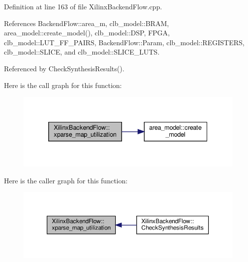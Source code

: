 Definition at line 163 of file Xilinx\+Backend\+Flow.\+cpp.



References Backend\+Flow\+::area\+\_\+m, clb\+\_\+model\+::\+B\+R\+AM, area\+\_\+model\+::create\+\_\+model(), clb\+\_\+model\+::\+D\+SP, F\+P\+GA, clb\+\_\+model\+::\+L\+U\+T\+\_\+\+F\+F\+\_\+\+P\+A\+I\+RS, Backend\+Flow\+::\+Param, clb\+\_\+model\+::\+R\+E\+G\+I\+S\+T\+E\+RS, clb\+\_\+model\+::\+S\+L\+I\+CE, and clb\+\_\+model\+::\+S\+L\+I\+C\+E\+\_\+\+L\+U\+TS.



Referenced by Check\+Synthesis\+Results().

Here is the call graph for this function\+:
\nopagebreak
\begin{figure}[H]
\begin{center}
\leavevmode
\includegraphics[width=332pt]{d6/d94/classXilinxBackendFlow_aee48e3dc259b3310102e708480a99410_cgraph}
\end{center}
\end{figure}
Here is the caller graph for this function\+:
\nopagebreak
\begin{figure}[H]
\begin{center}
\leavevmode
\includegraphics[width=350pt]{d6/d94/classXilinxBackendFlow_aee48e3dc259b3310102e708480a99410_icgraph}
\end{center}
\end{figure}
\mbox{\label{classXilinxBackendFlow_ad6ce13107d22bc9adc43b9b5e1423e6d}} 

